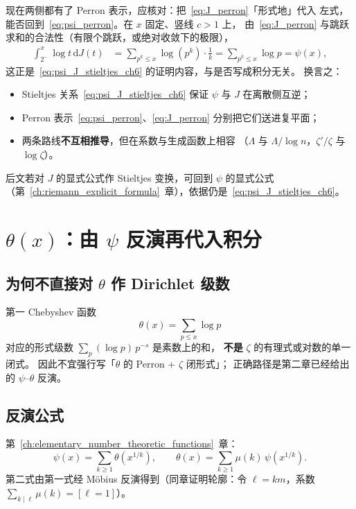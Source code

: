 现在两侧都有了 Perron 表示，应核对：把~\eqref{eq:J_perron}「形式地」代入
左式，能否回到~\eqref{eq:psi_perron}。在 $x$ 固定、竖线 $c>1$ 上，
由~\eqref{eq:J_perron} 与跳跃求和的合法性（有限个跳跃，或绝对收敛下的极限），
\begin{align*}
  \int_{2^-}^{x}\log t\,\mathrm{d}J(t)
  &=\sum_{p^k\le x}\log(p^k)\cdot\frac{1}{k}
  =\sum_{p^k\le x}\log p
  =\psi(x),
\end{align*}
这正是~\eqref{eq:psi_J_stieltjes_ch6} 的证明内容，与是否写成积分无关。
换言之：
\begin{itemize}
  \item Stieltjes 关系~\eqref{eq:psi_J_stieltjes_ch6} 保证 $\psi$ 与 $J$ 在离散侧互逆；
  \item Perron 表示~\eqref{eq:psi_perron}、\eqref{eq:J_perron} 分别把它们送进复平面；
  \item 两条路线\textbf{不互相推导}，但在系数与生成函数上相容
        （$\Lambda$ 与 $\Lambda/\log n$，$\zeta'/\zeta$ 与 $\log\zeta$）。
\end{itemize}
后文若对 $J$ 的显式公式作 Stieltjes 变换，可回到 $\psi$ 的显式公式
（第~\ref{ch:riemann_explicit_formula}~章），依据仍是~\eqref{eq:psi_J_stieltjes_ch6}。


\section{\texorpdfstring{$\theta(x)$}{theta(x)}：由 \texorpdfstring{$\psi$}{psi} 反演再代入积分}
\label{sec:theta_integral}

\subsection{为何不直接对 $\theta$ 作 Dirichlet 级数}

第一 Chebyshev 函数
\[
  \theta(x)=\sum_{p\le x}\log p
\]
对应的形式级数 $\sum_{p}(\log p)\,p^{-s}$ 是素数上的和，
\textbf{不是} $\zeta$ 的有理式或对数的单一闭式。
因此不宜强行写「$\theta$ 的 Perron + $\zeta$ 闭形式」；
正确路径是第二章已经给出的 $\psi$--$\theta$ 反演。

\subsection{反演公式}

第~\ref{ch:elementary_number_theoretic_functions}~章：
\begin{equation}
  \psi(x)=\sum_{k\ge 1}\theta\!\left(x^{1/k}\right),
  \qquad
  \theta(x)=\sum_{k\ge 1}\mu(k)\,\psi\!\left(x^{1/k}\right).
  \label{eq:theta_psi_inv_ch6}
\end{equation}
第二式由第一式经 Möbius 反演得到（同章证明轮廓：令 $\ell=km$，系数
$\sum_{k\mid\ell}\mu(k)=[\ell=1]$）。

